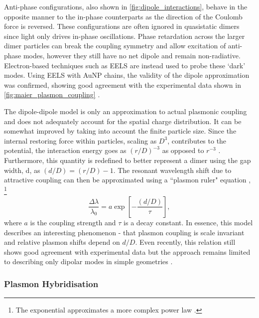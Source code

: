 \documentclass{article}
\begin{document}
Anti-phase configurations, also shown in \autoref{fig:dipole_interactions}, behave in the opposite manner to the in-phase counterparts as the direction of the Coulomb force is reversed. These configurations are often ignored in quasistatic dimers since light only drives in-phase oscillations. Phase retardation across the larger dimer particles can break the coupling symmetry and allow excitation of anti-phase modes, however they still have no net dipole and remain non-radiative. Electron-based techniques such as EELS are instead used to probe these `dark' modes. Using EELS with AuNP chains, the validity of the dipole approximation was confirmed, showing good agreement with the experimental data shown in \autoref{fig:maier_plasmon_coupling} \cite{maier2002}.

The dipole-dipole model is only an approximation to actual plasmonic coupling and does not adequately account for the spatial charge distribution. It can be somewhat improved by taking into account the finite particle size. Since the internal restoring force within particles, scaling as $D^3$, contributes to the potential, the interaction energy goes as $(r/D)^{-3}$ as opposed to $r^{-3}$ \cite{jain2007}. Furthermore, this quantity is redefined to better represent a dimer using the gap width, \gls{d}, as $(d/D) = (r/D)-1$. The resonant wavelength shift due to attractive coupling can then be approximated using a ``plasmon ruler" equation \cite{jain2007, ben2011},%
\footnote{The exponential approximates a more complex power law \cite{kadkhodazadeh2014scaling}.}
\begin{equation}
	\frac{\Delta\lambda}{\lambda_0} = a\exp{\left[-\frac{(d/D)}{\tau}\right]},
	\label{eq:plasmon_ruler}
\end{equation}
where $a$ is the coupling strength and $\tau$ is a decay constant. In essence, this model describes an interesting phenomenon - that plasmon coupling is scale invariant and relative plasmon shifts depend on $d/D$. Even recently, this relation still shows good agreement with experimental data but the approach remains limited to describing only dipolar modes in simple geometries \cite{muskens2007}.

\FloatBarrier
\subsubsection{Plasmon Hybridisation}
\end{document}
